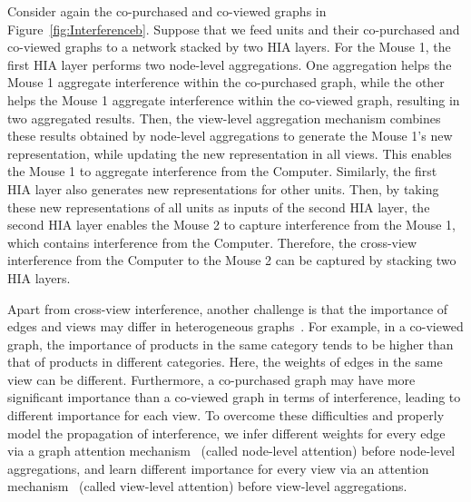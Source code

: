\documentclass[runningheads]{llncs}
\begin{document}
Consider again the co-purchased and co-viewed graphs in Figure~\ref{fig:Interferenceb}.
Suppose that we feed units and their co-purchased and co-viewed graphs to a network stacked by two HIA layers. For the Mouse 1, the first HIA layer performs two node-level aggregations.  One aggregation helps the Mouse 1 aggregate interference within the co-purchased graph, while the other helps the Mouse 1 aggregate interference within the co-viewed graph, resulting in two aggregated results. Then, the view-level aggregation mechanism combines these  results obtained by node-level aggregations to generate the Mouse 1's new representation, while updating the new representation in all views. This enables the Mouse 1 to aggregate interference from the Computer.  Similarly, the first HIA layer also generates new representations for other units. Then, by taking these new representations of all units as inputs of the second HIA layer,  the second HIA layer enables the Mouse 2  to capture interference from the Mouse 1, which contains interference from the Computer. Therefore, the cross-view interference from the Computer to the Mouse 2 can be captured by stacking two HIA layers.


Apart from cross-view interference, another challenge is that the importance of edges  and  views may differ in heterogeneous graphs~\cite{wang2019heterogeneous}. For example,  in a co-viewed graph, the importance of products in the same category tends to be higher than that of products in different categories. Here, the weights of edges in the same view can be different. Furthermore, a co-purchased graph may have more significant importance than a co-viewed graph in terms of interference, leading to different importance for each view.  To overcome these difficulties and properly model the propagation of interference, we infer different weights for every edge via a graph attention mechanism~\cite{vel2018graph} (called node-level attention) before node-level aggregations, and learn different importance  for every view via an attention mechanism~\cite{vaswani2017attention,wang2019heterogeneous} (called view-level attention) before view-level aggregations.
\end{document}
